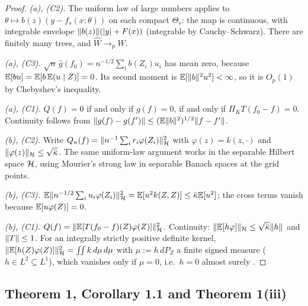 \begin{proof}
\emph{(a), (C2).} The uniform law of large numbers \citep[Lemma 2.4]{neweymcfadden1994} applies to $\theta \mapsto b(z)(y - f_s(x;\theta))$ on each compact $\Theta_s$: the map is continuous, with integrable envelope $\lVert b(z)\rVert(\lvert y\rvert + F(x))$ (integrable by Cauchy--Schwarz). There are finitely many trees, and $\hat W \to_p W$.

\emph{(a), (C3).} $\sqrt n\,\hat g(f_0) = n^{-1/2}\sum_ib(Z_i)u_i$ has mean zero, because $\mathbb{E}[bu] = \mathbb{E}[b\,\mathbb{E}(u \mid Z)] = 0$. Its second moment is $\mathbb{E}[\lVert b\rVert^2u^2] < \infty$, so it is $O_p(1)$ by Chebyshev's inequality.

\emph{(a), (C1).} $Q(f) = 0$ if and only if $g(f) = 0$, if and only if $\Pi_KT(f_0 - f) = 0$. Continuity follows from $\lVert g(f) - g(f')\rVert \le (\mathbb{E}\lVert b\rVert^2)^{1/2}\lVert f - f'\rVert$.

\emph{(b), (C2).} Write $Q_n(f) = \lVert n^{-1}\sum_ir_i\varphi(Z_i)\rVert_{\mathcal{H}}^2$ with $\varphi(z) = k(z, \cdot)$ and $\lVert \varphi(z)\rVert_{\mathcal{H}} \le \sqrt{\bar\kappa}$. The same uniform-law argument works in the separable Hilbert space $\mathcal{H}$, using Mourier's strong law in separable Banach spaces \citep{mourier1953} at the grid points.

\emph{(b), (C3).} $\mathbb{E}\lVert n^{-1/2}\sum_iu_i\varphi(Z_i)\rVert_{\mathcal{H}}^2 = \mathbb{E}[u^2k(Z,Z)] \le \bar\kappa\mathbb{E}[u^2]$; the cross terms vanish because $\mathbb{E}[u\varphi(Z)] = 0$.

\emph{(b), (C1).} $Q(f) = \lVert \mathbb{E}[T(f_0 - f)(Z)\varphi(Z)]\rVert_{\mathcal{H}}^2$. Continuity: $\lVert \mathbb{E}[h\varphi]\rVert_{\mathcal{H}} \le \sqrt{\bar\kappa}\lVert h\rVert$ and $\lVert T\rVert \le 1$. For an integrally strictly positive definite kernel, $\lVert \mathbb{E}[h(Z)\varphi(Z)]\rVert_{\mathcal{H}}^2 = \iint k\,d\mu\,d\mu$ with $\mu := h\,dP_Z$ a finite signed measure ($h \in L^2 \subseteq L^1$), which vanishes only if $\mu = 0$, i.e.\ $h = 0$ almost surely \citep{sriperumbudur2011}.
\end{proof}

\subsection{Theorem 1, Corollary 1.1 and Theorem 1(iii)}

